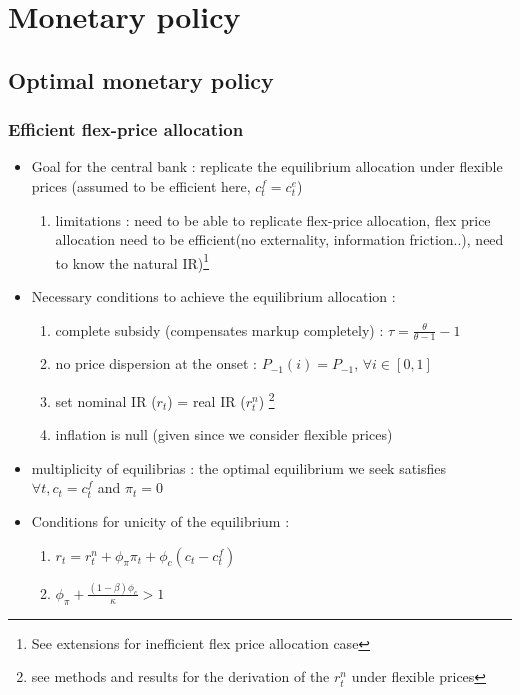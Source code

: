 \documentclass{article}
\begin{document}
\section{Monetary policy}

\subsection{Optimal monetary policy}

\subsubsection{Efficient flex-price allocation}
\begin{itemize}
    \item Goal for the central bank : replicate the equilibrium allocation under flexible prices (assumed to be efficient here, $c_t^f=c_t^e$)
    \begin{enumerate}
        \item limitations : need to be able to replicate flex-price allocation, flex price allocation need to be efficient(no externality, information friction..), need to know the natural IR)\footnote{See extensions for inefficient flex price allocation case}
    \end{enumerate}
    \item Necessary conditions to achieve the equilibrium allocation : 
    \begin{enumerate}
        \item complete subsidy (compensates markup completely) : $\tau = \frac{\theta}{\theta-1}-1$ 
        \item no price dispersion at the onset : $P_{-1}(i)=P_{-1}$, $\forall i\in[0,1]$
        \item set nominal IR ($r_t$) = real IR ($r_t^n$) \footnote{see methods and results for the derivation of the $r_t^n$ under flexible prices}
        \item inflation is null (given since we consider flexible prices)
    \end{enumerate}
    \item multiplicity of equilibrias : the optimal equilibrium we seek satisfies $\forall t, c_t=c_t^f$ and $\pi_t=0$
    \item Conditions for unicity of the equilibrium : 
    \begin{enumerate}
        \item $r_t=r_t^n+\phi_{\pi}\pi_t+\phi_c(c_t-c_t^f)$
        \item $\phi_{\pi}+\frac{(1-\beta)\phi_c}{\kappa} > 1$
    \end{enumerate}
\end{itemize}
\end{document}
